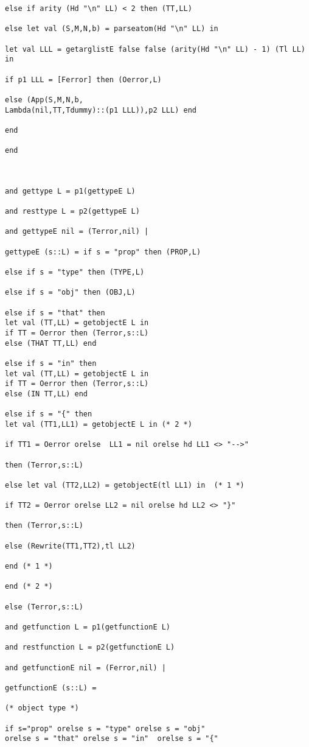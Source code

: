 \documentclass[12pt]{article}
\begin{document}
\begin{verbatim}
else if arity (Hd "\n" LL) < 2 then (TT,LL)

else let val (S,M,N,b) = parseatom(Hd "\n" LL) in

let val LLL = getarglistE false false (arity(Hd "\n" LL) - 1) (Tl LL) in 

if p1 LLL = [Ferror] then (Oerror,L)

else (App(S,M,N,b,
Lambda(nil,TT,Tdummy)::(p1 LLL)),p2 LLL) end

end 

end 



and gettype L = p1(gettypeE L)

and resttype L = p2(gettypeE L)

and gettypeE nil = (Terror,nil) |

gettypeE (s::L) = if s = "prop" then (PROP,L)

else if s = "type" then (TYPE,L)

else if s = "obj" then (OBJ,L)

else if s = "that" then
let val (TT,LL) = getobjectE L in
if TT = Oerror then (Terror,s::L)
else (THAT TT,LL) end

else if s = "in" then
let val (TT,LL) = getobjectE L in
if TT = Oerror then (Terror,s::L)
else (IN TT,LL) end

else if s = "{" then
let val (TT1,LL1) = getobjectE L in (* 2 *)

if TT1 = Oerror orelse  LL1 = nil orelse hd LL1 <> "-->"

then (Terror,s::L)

else let val (TT2,LL2) = getobjectE(tl LL1) in  (* 1 *)

if TT2 = Oerror orelse LL2 = nil orelse hd LL2 <> "}"

then (Terror,s::L)

else (Rewrite(TT1,TT2),tl LL2)

end (* 1 *)

end (* 2 *)

else (Terror,s::L)

and getfunction L = p1(getfunctionE L)

and restfunction L = p2(getfunctionE L)

and getfunctionE nil = (Ferror,nil) |

getfunctionE (s::L) =

(* object type *)

if s="prop" orelse s = "type" orelse s = "obj"
orelse s = "that" orelse s = "in"  orelse s = "{"


\end{verbatim}
\end{document}
